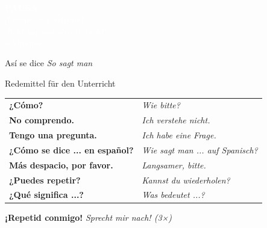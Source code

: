\documentclass[aspectratio=169, 11pt]{beamer}
\newcommand{\seriftext}[1]{{\fontfamily{ppl}\selectfont #1}}
\newcommand{\es}[1]{\seriftext{\textbf{#1}}}
\newcommand{\de}[1]{\textit{\textcolor{mittelgrau}{#1}}}
\begin{document}
\begin{frame}[plain]
    \vspace{3cm}
    \begin{center}
        {\Huge\bfseries\textcolor{white}{PAUSA}}\\[1cm]
        {\Large\textcolor{white}{¡Levantaos y estiraos!}}\\[0.5cm]
        {\large\textcolor{white}{\de{Steht auf und streckt euch!}}}\\[1cm]
        {\textcolor{white}{5 Minuten}}
    \end{center}
\end{frame}


\begin{frame}{Así se dice \de{So sagt man}}
    \vspace{0.3cm}

    {\large Redemittel für den Unterricht}

    \vspace{0.5cm}

    \renewcommand{\arraystretch}{1.5}
    \begin{tabular}{ll}
        \es{¿Cómo?} & \de{Wie bitte?} \\
        \es{No comprendo.} & \de{Ich verstehe nicht.} \\
        \es{Tengo una pregunta.} & \de{Ich habe eine Frage.} \\
        \es{¿Cómo se dice ... en español?} & \de{Wie sagt man ... auf Spanisch?} \\
        \es{Más despacio, por favor.} & \de{Langsamer, bitte.} \\
        \es{¿Puedes repetir?} & \de{Kannst du wiederholen?} \\
        \es{¿Qué significa ...?} & \de{Was bedeutet ...?} \\
    \end{tabular}

    \vspace{0.5cm}

    \es{¡Repetid conmigo!} \de{Sprecht mir nach! (3×)}
\end{frame}
\end{document}
